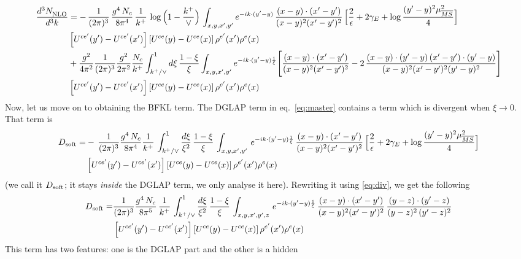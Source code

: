 \documentclass[9pt]{article}
\numberwithin{equation}{section}
\begin{document}
\begin{align}
\frac{d^{3}N_{\rm NLO}^{\rm}}{d^{3}k}  & =
-\,\frac{1}{(2\pi)^{3}}\,\frac{g^{4}\,N_{c}}{8\pi^{4}}\,\frac{1}{k^{+}}\,\log\Big(1-\frac{k^{+}}{\vee}\Big)\,\int_{x,y,x',y'}e^{-ik\cdot(y'-y)}\,\frac{(x-y)\cdot(x'-y')}{(x-y)^{2}(x'-y')^{2}}\,\Big[\frac{2}{\epsilon}+2\gamma_{E}+\log\frac{(y'-y)^{2}\mu^{2}_{\overline{MS}}}{4}\Big]\notag \\ & \left[U^{ce'}(y')-U^{ce'}(x')\right]\left[U^{ce}(y)-U^{ce}(x)\right]\rho^{e'}(x')\rho^{e}(x)\notag\\
&+\frac{g^{2}}{4\pi^{2}}\frac{1}{(2\pi)^{3}}\frac{g^{2}}{2\pi^{2}}\frac{N_{c}}{k^{+}}\int_{k^{+}/\vee}^{1}d\xi\,\frac{1-\xi}{\xi}\int_{x,y,x',y'}e^{-ik\cdot(y'-y)\frac{1}{\xi}}\Bigg[\frac{(x-y)\cdot(x'-y')}{(x-y)^{2}(x'-y')^{2}}-2\,\frac{(x-y)\cdot(y'-y)\,(x'-y')\cdot(y'-y)}{(x-y)^{2}(x'-y')^{2}(y'-y)^{2}}\Bigg]\notag \\ & \left[U^{ce'}(y')-U^{ce'}(x')\right]\left[U^{ce}(y)-U^{ce}(x)\right]\rho^{e'}(x')\rho^{e}(x)
\end{align}
Now, let us move on to obtaining the BFKL term. The DGLAP term in eq.~\eqref{eq:master}
contains a term which is divergent when $\xi \to 0$. That term is
\begin{align}\label{eq:dsoft}
D_{\rm soft}=&-\,\frac{1}{(2\pi)^{3}}\frac{g^{4}\,N_{c}}{8\pi^{4}}\frac{1}{k^{+}}\,\int_{k^{+}/\vee}^{1}\frac{d\xi}{\xi^{2}}\,\frac{1-\xi}{\xi}\,\int_{x,y,x',y'}\,e^{-ik\cdot(y'-y)\frac{1}{\xi}}\,\frac{(x-y)\cdot(x'-y')}{(x-y)^{2}(x'-y')^{2}}\, \Big[\frac{2}{\epsilon}+2\gamma_{E}+\log\frac{(y'-y)^{2}\mu^{2}_{\overline{MS}}}{4}\Big]\notag \\ & \left[U^{ce'}(y')-U^{ce'}(x')\right]\left[U^{ce}(y)-U^{ce}(x)\right]\rho^{e'}(x')\rho^{e}(x)
\end{align}
(we call it $D_{\rm soft}$; it stays \emph{inside} the DGLAP term, we only analyse it here).
Rewriting it using \eqref{eq:div}, we get the following
\begin{align} \label{eq:second}
    D_{\rm soft} = &\frac{1}{(2\pi)^{3}}\frac{g^{4}\,N_{c}}{8\pi^{5}}\,\frac{1}{k^{+}}\,\int_{k^{+}/\vee}^{1}\frac{d\xi}{\xi^{2}}\,\frac{1-\xi}{\xi}\,\int_{x,y,x',y',z}\,e^{-ik\cdot(y'-y)\frac{1}{\xi}}\,\frac{(x-y)\cdot(x'-y')}{(x-y)^{2}(x'-y')^{2}}\,\frac{(y-z)\cdot (y'-z)}{(y-z)^{2}\, (y'-z)^{2}}\notag \\ & \left[U^{ce'}(y')-U^{ce'}(x')\right]\left[U^{ce}(y)-U^{ce}(x)\right]\rho^{e'}(x')\rho^{e}(x)
\end{align}
This term has two features: one is the DGLAP part and the other is a hidden
\end{document}
